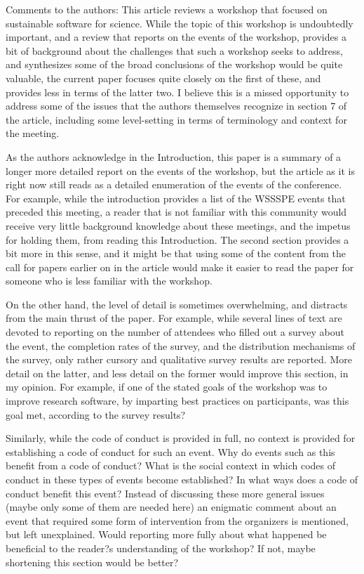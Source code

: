 \documentclass[11pt]{article}
\begin{document}
\begin{quoting}
Comments to the authors: 
This article reviews a workshop that focused on sustainable software for science. While the topic of this workshop is undoubtedly important, and a review that reports on the events of the workshop, provides a bit of background about the challenges that such a workshop seeks to address, and synthesizes some of the broad conclusions of the workshop would be quite valuable, the current paper focuses quite closely on the first of these, and provides less in terms of the latter two. I believe this is a missed opportunity to address some of the issues that the authors themselves recognize in section 7 of the article, including some level-setting in terms of terminology and context for the meeting.

As the authors acknowledge in the Introduction, this paper is a summary of a longer more detailed report on the events of the workshop, but the article as it is right now still reads as a detailed enumeration of the events of the conference. For example, while the introduction provides a list of the WSSSPE events that preceded this meeting, a reader that is not familiar with this community would receive very little background knowledge about these meetings, and the impetus for holding them, from reading this Introduction. The second section provides a bit more in this sense, and it might be that using some of the content from the call for papers earlier on in the article would make it easier to read the paper for someone who is less familiar with the workshop.

On the other hand, the level of detail is sometimes overwhelming, and distracts from the main thrust of the paper. For example, while several lines of text are devoted to reporting on the number of attendees who filled out a survey about the event, the completion rates of the survey, and the distribution mechanisms of the survey, only rather cursory and qualitative survey results are reported. More detail on the latter, and less detail on the former would improve this section, in my opinion.  For example, if one of the stated goals of the workshop was to improve research software, by imparting best practices on participants, was this goal met, according to the survey results? 

Similarly, while the code of conduct is provided in full, no context is provided for establishing a code of conduct for such an event. Why do events such as this benefit from a code of conduct? What is the social context in which codes of conduct in these types of events become established? In what ways does a code of conduct benefit this event? Instead of discussing these more general issues (maybe only some of them are needed here) an enigmatic comment about an event that required some form of intervention from the organizers is mentioned, but left unexplained. Would reporting more fully about what happened be beneficial to the reader?s understanding of the workshop? If not, maybe shortening this section would be better?


\end{quoting}
\end{document}

